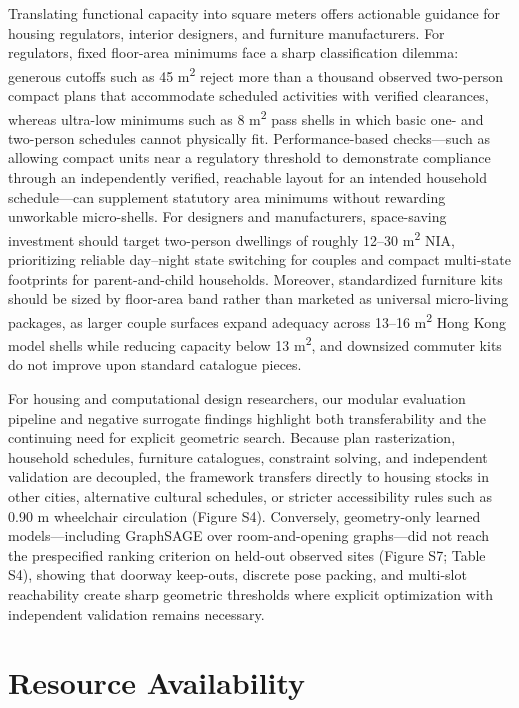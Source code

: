\documentclass[12pt,letterpaper]{article}
\begin{document}
Translating functional capacity into square meters offers actionable guidance for housing regulators, interior designers, and furniture manufacturers. For regulators, fixed floor-area minimums face a sharp classification dilemma: generous cutoffs such as 45 m\textsuperscript{2} reject more than a thousand observed two-person compact plans that accommodate scheduled activities with verified clearances, whereas ultra-low minimums such as 8 m\textsuperscript{2} pass shells in which basic one- and two-person schedules cannot physically fit. Performance-based checks---such as allowing compact units near a regulatory threshold to demonstrate compliance through an independently verified, reachable layout for an intended household schedule---can supplement statutory area minimums without rewarding unworkable micro-shells. For designers and manufacturers, space-saving investment should target two-person dwellings of roughly 12--30 m\textsuperscript{2} NIA, prioritizing reliable day--night state switching for couples and compact multi-state footprints for parent-and-child households. Moreover, standardized furniture kits should be sized by floor-area band rather than marketed as universal micro-living packages, as larger couple surfaces expand adequacy across 13--16 m\textsuperscript{2} Hong Kong model shells while reducing capacity below 13 m\textsuperscript{2}, and downsized commuter kits do not improve upon standard catalogue pieces.

For housing and computational design researchers, our modular evaluation pipeline and negative surrogate findings highlight both transferability and the continuing need for explicit geometric search. Because plan rasterization, household schedules, furniture catalogues, constraint solving, and independent validation are decoupled, the framework transfers directly to housing stocks in other cities, alternative cultural schedules, or stricter accessibility rules such as 0.90 m wheelchair circulation (Figure S4). Conversely, geometry-only learned models---including GraphSAGE over room-and-opening graphs---did not reach the prespecified ranking criterion on held-out observed sites (Figure S7; Table S4), showing that doorway keep-outs, discrete pose packing, and multi-slot reachability create sharp geometric thresholds where explicit optimization with independent validation remains necessary.

\section{Resource Availability}\label{resource-availability}
\end{document}
